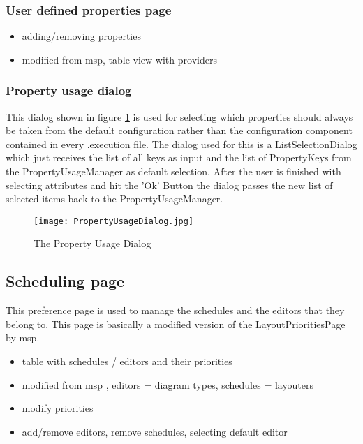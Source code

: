 \subsubsection{User defined properties page}
\begin{itemize}
 \item adding/removing properties
 \item modified from msp, table view with providers
\end{itemize}

\subsubsection{Property usage dialog}
This dialog shown in figure \ref{fig:PropertyUsageDialog} is used for selecting which properties should always be taken
from the default configuration rather than the configuration component contained
in every .execution file.
The dialog used for this is a ListSelectionDialog which just receives the list of
all keys as input and the list of PropertyKeys from the PropertyUsageManager as default selection.
After the user is finished with selecting attributes and hit the 'Ok' Button the dialog
passes the new list of selected items back to the PropertyUsageManager.
\begin{figure}[PropertyUsageDialog]
  \centering
  \texttt{[image: PropertyUsageDialog.jpg]}
  \caption[Property Usage Dialog]%
  {The Property Usage Dialog\protect}
  \label{fig:PropertyUsageDialog}
\end{figure}

\subsection{Scheduling page}
This preference page is used to manage the schedules and the editors that they belong to.
This page is basically a modified version of the LayoutPrioritiesPage by msp.

\begin{itemize}
 \item table with schedules / editors and their priorities
 \item modified from msp , editors = diagram types, schedules = layouters
 \item modify priorities
 \item add/remove editors, remove schedules, selecting default editor
\end{itemize}

